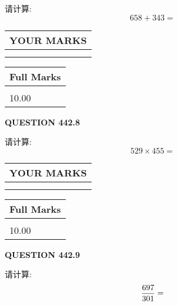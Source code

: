 \documentclass{ctexart}
\begin{document}
  
 
请计算:
\begin{equation}
658 +  %
343 = \nonumber
\end{equation}
 

 

 
  
\vspace{0.2in}
  
\noindent\begin{tabular}{|l|}
\hline
 YOUR MARKS  \\
\hline
 \\ 
 \\ 
\hline
\end{tabular}
\hspace{0.05in} \begin{tabular}{|l|}
\hline
 Full Marks  \\
\hline
 \\ 
10.00 \\
\hline
\end{tabular}
{\textbf{\Large{QUESTION
442.8 
}}}
  
  
 
请计算:
\begin{equation}
529  \times    %
455 = \nonumber
\end{equation}
 

 

 
  
\vspace{0.2in}
  
\noindent\begin{tabular}{|l|}
\hline
 YOUR MARKS  \\
\hline
 \\ 
 \\ 
\hline
\end{tabular}
\hspace{0.05in} \begin{tabular}{|l|}
\hline
 Full Marks  \\
\hline
 \\ 
10.00 \\
\hline
\end{tabular}
{\textbf{\Large{QUESTION
442.9 
}}}
  
  
 
请计算:
\begin{equation}
\frac { %
697 }  {  %
301} = \nonumber
\end{equation}
 

 
\end{document}
